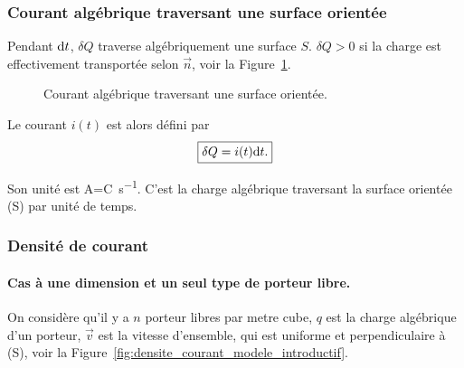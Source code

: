         \subsubsection{Courant algébrique traversant une surface orientée}

            Pendant $\mathrm{d} t$, $\delta Q$ traverse algébriquement une surface $S$. $\delta Q>0$ si la charge est effectivement transportée selon $\vec{n}$, voir la Figure~\ref{fig:courant_algebrique_traversant_surface_orientee}.

            \begin{figure}
                \centering
                \caption{Courant algébrique traversant une surface orientée.}    
                \label{fig:courant_algebrique_traversant_surface_orientee}
            \end{figure}

            Le courant $i(t)$ est alors défini par 
            \begin{equation}
                \boxed{
                    \delta Q=i(t)\mathrm{d} t.
                }
            \end{equation}

            Son unité est \si{\ampere}=\si{\coulomb\per\second}. C'est la charge algébrique traversant la surface orientée (S) par unité de temps.

        \subsubsection{Densité de courant}

            \paragraph{Cas à une dimension et un seul type de porteur libre.}

                On considère qu'il y a $n$ porteur libres par metre cube, $q$ est la charge algébrique d'un porteur, $\vec{v}$ est la vitesse d'ensemble, qui est uniforme et perpendiculaire à (S), voir la Figure~\ref{fig:densite_courant_modele_introductif}.

